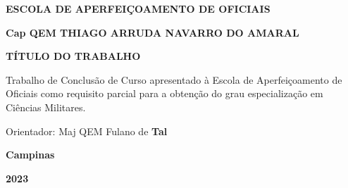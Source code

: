 \documentclass[12pt,a4paper]{article}
\begin{document}
\begin{titlepage}
    \centering
    \onehalfspacing
    \textbf{\Large ESCOLA DE APERFEIÇOAMENTO DE OFICIAIS} %
    
    \vspace{3\baselineskip} %

    \textbf{Cap QEM THIAGO ARRUDA NAVARRO DO AMARAL} %

    \vspace{4\baselineskip} %

    \textbf{TÍTULO DO TRABALHO} %

    \vspace{2\baselineskip} %


    \vspace{\baselineskip} %


    \vspace{4\baselineskip} %

    \begin{flushright}
    \begin{minipage}{0.5\textwidth}
        \singlespacing
        Trabalho de Conclusão de Curso apresentado à Escola de  Aperfeiçoamento de Oficiais como requisito parcial para a obtenção do grau especialização em Ciências Militares.

        \vspace{\baselineskip} %

        Orientador: Maj QEM Fulano de \textbf{Tal} %
    \end{minipage}
    \end{flushright}

    \vfill %

    \vspace{4cm} %

    \onehalfspacing
    \textbf{Campinas} %

    \vspace{\baselineskip} %

    \textbf{2023} %
\end{titlepage}
\end{document}
